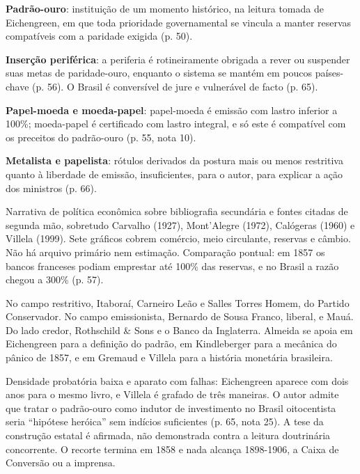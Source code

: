 
\textbf{Padrão-ouro}: instituição de um momento histórico, na leitura tomada de
Eichengreen, em que toda prioridade governamental se vincula a manter reservas
compatíveis com a paridade exigida (p. 50).

\textbf{Inserção periférica}: a periferia é rotineiramente obrigada a rever ou
suspender suas metas de paridade-ouro, enquanto o sistema se mantém em poucos
países-chave (p. 56). O Brasil é conversível de jure e vulnerável de facto (p.
65).

\textbf{Papel-moeda e moeda-papel}: papel-moeda é emissão com lastro inferior a
100\%; moeda-papel é certificado com lastro integral, e só este é compatível
com os preceitos do padrão-ouro (p. 55, nota 10).

\textbf{Metalista e papelista}: rótulos derivados da postura mais ou menos
restritiva quanto à liberdade de emissão, insuficientes, para o autor, para
explicar a ação dos ministros (p. 66).


Narrativa de política econômica sobre bibliografia secundária e fontes citadas
de segunda mão, sobretudo Carvalho (1927), Mont'Alegre (1972), Calógeras (1960)
e Villela (1999). Sete gráficos cobrem comércio, meio circulante, reservas e
câmbio. Não há arquivo primário nem estimação. Comparação pontual: em 1857 os
bancos franceses podiam emprestar até 100\% das reservas, e no Brasil a razão
chegou a 300\% (p. 57).


No campo restritivo, Itaboraí, Carneiro Leão e Salles Torres Homem, do Partido
Conservador. No campo emissionista, Bernardo de Sousa Franco, liberal, e Mauá.
Do lado credor, Rothschild \& Sons e o Banco da Inglaterra. Almeida se apoia em
Eichengreen para a definição do padrão, em Kindleberger para a mecânica do
pânico de 1857, e em Gremaud e Villela para a história monetária brasileira.


Densidade probatória baixa e aparato com falhas: Eichengreen aparece com dois
anos para o mesmo livro, e Villela é grafado de três maneiras. O autor admite
que tratar o padrão-ouro como indutor de investimento no Brasil oitocentista
seria ``hipótese heróica'' sem indícios suficientes (p. 65, nota 25). A tese da
construção estatal é afirmada, não demonstrada contra a leitura doutrinária
concorrente. O recorte termina em 1858 e nada alcança 1898-1906, a Caixa de
Conversão ou a imprensa.

